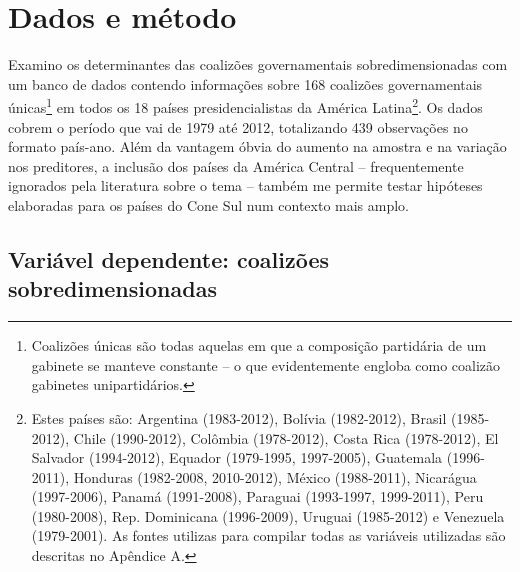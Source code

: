 \section{Dados e método}

Examino os determinantes das coalizões governamentais sobredimensionadas com um banco de dados contendo informações sobre 168 coalizões governamentais únicas\footnote{Coalizões únicas são todas aquelas em que a composição partidária de um gabinete se manteve constante -- o que evidentemente engloba como coalizão gabinetes unipartidários.} em todos os 18 países presidencialistas da América Latina\footnote{Estes países são: Argentina (1983-2012), Bolívia (1982-2012), Brasil (1985-2012), Chile (1990-2012), Colômbia (1978-2012), Costa Rica (1978-2012), El Salvador (1994-2012), Equador (1979-1995, 1997-2005), Guatemala (1996-2011), Honduras (1982-2008, 2010-2012), México (1988-2011), Nicarágua (1997-2006), Panamá (1991-2008), Paraguai (1993-1997, 1999-2011), Peru (1980-2008), Rep. Dominicana (1996-2009), Uruguai (1985-2012) e Venezuela (1979-2001). As fontes utilizas para compilar todas as variáveis utilizadas são descritas no Apêndice A.}. Os dados cobrem o período que vai de 1979 até 2012, totalizando 439 observações no formato país-ano. Além da vantagem óbvia do aumento na amostra e na variação nos preditores, a inclusão dos países da América Central -- frequentemente ignorados pela literatura sobre o tema -- também me permite testar hipóteses elaboradas para os países do Cone Sul num contexto mais amplo.

\subsection{Variável dependente: coalizões sobredimensionadas}

